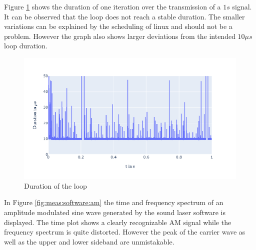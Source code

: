 Figure \ref{fig:meas:software:duration} shows the duration of one iteration over the transmission of a $1s$ signal. It can be observed that the loop does not reach a stable duration. The smaller variations can be explained by the scheduling of linux and should not be a problem. However the graph also shows larger deviations from the intended $10\mu s$ loop duration.
%
\begin{figure}[ht]
  \centering
  \includegraphics[height=\mediumheight]{src/assets/pictures/measurements/software_duration.pdf}
  \caption{Duration of the loop}\label{fig:meas:software:duration}
\end{figure}
\newpage\noindent
In Figure \ref{fig:meas:software:am} the time and frequency spectrum of an amplitude modulated sine wave generated by the sound laser software is displayed. The time plot shows a clearly recognizable AM signal while the frequency spectrum is quite distorted. However the peak of the carrier wave as well as the upper and lower sideband are unmistakable.
%
